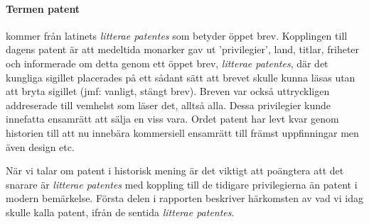 \paragraph{Termen patent} kommer från latinets \emph{litterae patentes} som betyder öppet 
brev. Kopplingen till dagens patent är att medeltida monarker gav ut
'privilegier', land, titlar, friheter och informerade om detta genom ett öppet 
brev, \emph{litterae patentes}, där det kungliga sigillet placerades på ett
sådant sätt att brevet skulle kunna läsas utan att bryta sigillet (jmf: 
vanligt, stängt brev). Breven var också uttryckligen addreserade till 
vemhelst som läser det, alltså alla. Dessa privilegier kunde innefatta ensamrätt
att sälja en viss vara. Ordet patent har levt kvar genom historien till 
att nu innebära kommersiell ensamrätt till främst uppfinningar men även 
design etc. \cite{blackstone vad hänvisas?}

När vi talar om patent i historisk mening är det viktigt att poängtera att det 
snarare är \emph{litterae patentes} med koppling till de tidigare 
privilegierna än patent i modern bemärkelse. Första delen i rapporten beskriver
härkomsten av vad vi idag skulle kalla patent, ifrån de sentida \emph{litterae patentes}.
